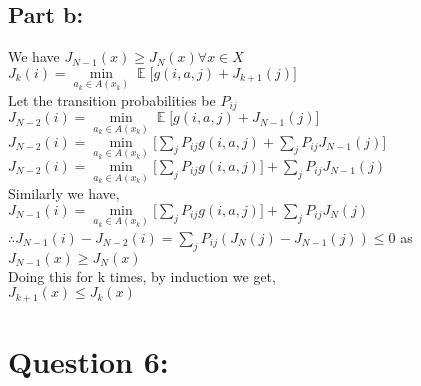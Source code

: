 \documentclass{article}
\begin{document}
\subsection{Part b:}
We have $J_{N-1}(x) \geq J_N(x) \forall x \in X$\\
$J_k(i)=\min\limits_{a_k \in A(x_k)}\displaystyle \mathop{\mathbb{E}} \Big[ g(i,a,j)+J_{k+1}(j)\Big]$\\
Let the transition probabilities be $P_{ij}$\\
$J_{N-2}(i)=\min\limits_{a_k \in A(x_k)}\displaystyle \mathop{\mathbb{E}} \Big[ g(i,a,j)+J_{N-1}(j)\Big]$\\
$J_{N-2}(i)=\min\limits_{a_k \in A(x_k)}\Big[ \sum_{j}P_{ij} g(i,a,j)+\sum_{j}P_{ij}J_{N-1}(j)\Big]$\\
$J_{N-2}(i)=\min\limits_{a_k \in A(x_k)}\Big[ \sum_{j}P_{ij} g(i,a,j)\Big]+\sum_{j}P_{ij}J_{N-1}(j)$\\
Similarly we have,\\
$J_{N-1}(i)=\min\limits_{a_k \in A(x_k)}\Big[ \sum_{j}P_{ij} g(i,a,j)\Big]+\sum_{j}P_{ij}J_{N}(j)$\\
$\therefore J_{N-1}(i)-J_{N-2}(i)=\sum_{j}P_{ij}(J_N(j)-J_{N-1}(j)) \leq 0 $ as $ J_{N-1}(x) \geq J_N(x)$\\
Doing this for k times, by induction we get,\\
$J_{k+1}(x) \leq J_{k}(x)$\\


\section{Question 6:}
\end{document}
